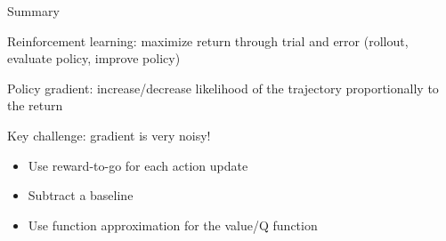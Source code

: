 \documentclass[usenames,dvipsnames,notes,11pt,aspectratio=169,hyperref={colorlinks=true, linkcolor=blue}]{beamer}
\begin{document}
\begin{frame}
    {Summary}
    \begin{wideitemize}
        \item Reinforcement learning: maximize return through trial and error (rollout, evaluate policy, improve policy)
        \item Policy gradient: increase/decrease likelihood of the trajectory proportionally to the return
        \item Key challenge: gradient is very noisy!
            \begin{itemize}
                \item Use reward-to-go for each action update
                \item Subtract a baseline
                \item Use function approximation for the value/Q function
            \end{itemize}
    \end{wideitemize}
\end{frame}
\end{document}
